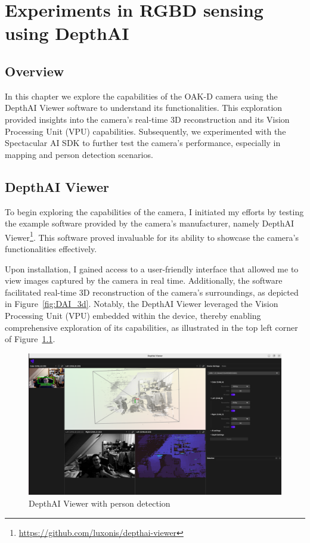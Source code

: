 \chapter{Experiments in RGBD sensing using DepthAI} \label{experiments_oak_d}

\section{Overview}

In this chapter we explore the capabilities of the OAK-D camera using the DepthAI Viewer software to understand its functionalities. This exploration provided insights into the camera's real-time 3D reconstruction and its Vision Processing Unit (VPU) capabilities. Subsequently, we experimented with the Spectacular AI SDK to further test the camera's performance, especially in mapping and person detection scenarios.


\section{DepthAI Viewer}

To begin exploring the capabilities of the camera, I initiated my efforts by testing the example software provided by the camera's manufacturer, namely DepthAI Viewer\footnote{\url{https://github.com/luxonis/depthai-viewer}}. This software proved invaluable for its ability to showcase the camera's functionalities effectively.

Upon installation, I gained access to a user-friendly interface that allowed me to view images captured by the camera in real time. Additionally, the software facilitated real-time 3D reconstruction of the camera's surroundings, as depicted in Figure~\ref{fig:DAI_3d}. Notably, the DepthAI Viewer leveraged the Vision Processing Unit (VPU) embedded within the device, thereby enabling comprehensive exploration of its capabilities, as illustrated in the top left corner of Figure~\ref{fig:DAI_person_detection}.

\FloatBarrier
\begin{figure}[htbp]
	\centering
	\includegraphics[width=150mm, keepaspectratio]{figures/depthai_viewer.png}
	\caption{DepthAI Viewer with person detection}
	\label{fig:DAI_person_detection}
\end{figure}

